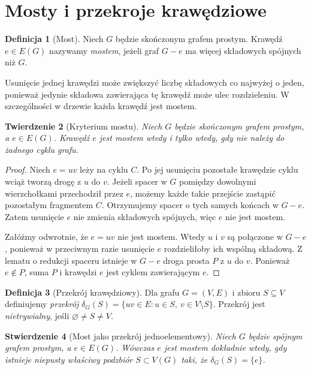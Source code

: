 \documentclass[11pt,a4paper]{report}
\numberwithin{equation}{section}
\theoremstyle{plain}
\newtheorem{twierdzenie}{Twierdzenie}[section]
\newtheorem{stwierdzenie}[twierdzenie]{Stwierdzenie}
\theoremstyle{definition}
\newtheorem{definicja}[twierdzenie]{Definicja}
\theoremstyle{remark}
\begin{document}
\section{Mosty i przekroje krawędziowe}
\label{sec:tg-mosty}

\begin{definicja}[Most]
Niech $G$ będzie skończonym grafem prostym.
Krawędź $e\in E(G)$ nazywamy \emph{mostem},
jeżeli graf $G-e$ ma więcej składowych spójnych
niż $G$.
\end{definicja}

Usunięcie jednej krawędzi może zwiększyć liczbę składowych
co najwyżej o jeden, ponieważ jedynie składowa zawierająca
tę krawędź może ulec rozdzieleniu. W szczególności
w drzewie każda krawędź jest mostem.

\begin{twierdzenie}[Kryterium mostu]
Niech $G$ będzie skończonym grafem prostym,
a $e\in E(G)$. Krawędź $e$ jest mostem wtedy
i tylko wtedy, gdy nie należy do żadnego cyklu grafu.
\end{twierdzenie}

\begin{proof}
Niech $e=uv$ leży na cyklu $C$. Po jej
usunięciu pozostałe krawędzie cyklu wciąż
tworzą drogę z $u$ do $v$. Jeżeli spacer
w $G$ pomiędzy dowolnymi wierzchołkami
przechodził przez $e$, możemy każde takie
przejście zastąpić pozostałym fragmentem
$C$. Otrzymujemy spacer o tych samych
końcach w $G-e$. Zatem usunięcie $e$
nie zmienia składowych spójnych, więc $e$
nie jest mostem.

Załóżmy odwrotnie, że $e=uv$ nie jest
mostem. Wtedy $u$ i $v$ są połączone
w $G-e$, ponieważ w przeciwnym razie
usunięcie $e$ rozdzieliłoby ich wspólną
składową. Z lematu o redukcji spaceru
istnieje w $G-e$ droga prosta $P$ z $u$
do $v$. Ponieważ $e\notin P$, suma $P$
i krawędzi $e$ jest cyklem zawierającym $e$.
\end{proof}

\begin{definicja}[Przekrój krawędziowy]
Dla grafu $G=(V,E)$ i zbioru
$S\subseteq V$ definiujemy \emph{przekrój}
$\delta_G(S)=\{uv\in E:u\in S,\ v\in V\setminus S\}$.
Przekrój jest \emph{nietrywialny}, jeśli
$\varnothing\ne S\ne V$.
\end{definicja}

\begin{stwierdzenie}[Most jako przekrój jednoelementowy]
Niech $G$ będzie spójnym grafem prostym,
a $e\in E(G)$. Wówczas $e$ jest mostem
dokładnie wtedy, gdy istnieje niepusty
właściwy podzbiór $S\subset V(G)$ taki, że
$\delta_G(S)=\{e\}$.
\end{stwierdzenie}
\end{document}
